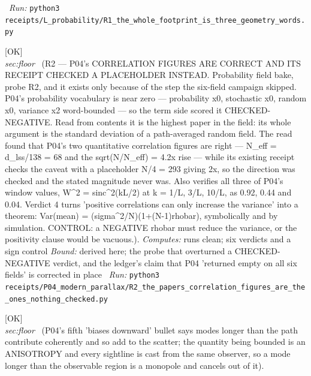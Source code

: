 \begin{description}
\ \emph{Run:} \texttt{python3 receipts/L\_probability/R1\_the\_whole\_footprint\_is\_three\_geometry\_words.py}
\item[\label{rcpt:R2_the_papers_correlation_figures_are_the_ones_nothing_checked}\texttt{R2\_the\_papers\_correlation\_figures\_are\_the\_ones\_nothing\_checked}]\hfill\textsf{[OK]}\\
\textit{sec:floor} \ (R2 --- P04's CORRELATION FIGURES ARE CORRECT AND ITS RECEIPT CHECKED A PLACEHOLDER INSTEAD. Probability field bake, probe R2, and it exists only because of the step the six-field campaign skipped. P04's probability vocabulary is near zero --- probability x0, stochastic x0, random x0, variance x2 word-bounded --- so the term side scored it CHECKED-NEGATIVE. Read from contents it is the highest paper in the field: its whole argument is the standard deviation of a path-averaged random field. The read found that P04's two quantitative correlation figures are right --- N\_eff = d\_lss/138 = 68 and the sqrt(N/N\_eff) = 4.2x rise --- while its existing receipt checks the caveat with a placeholder N/4 = 293 giving 2x, so the direction was checked and the stated magnitude never was. Also verifies all three of P04's window values, \textbar{}W\textbar{}\textasciicircum{}2 = sinc\textasciicircum{}2(kL/2) at k = 1/L, 3/L, 10/L, as 0.92, 0.44 and 0.04. Verdict 4 turns 'positive correlations can only increase the variance' into a theorem: Var(mean) = (sigma\textasciicircum{}2/N)(1+(N-1)rhobar), symbolically and by simulation. CONTROL: a NEGATIVE rhobar must reduce the variance, or the positivity clause would be vacuous.). 
\emph{Computes:} runs clean; six verdicts and a sign control
 \emph{Bound:} derived here; the probe that overturned a CHECKED-NEGATIVE verdict, and the ledger's claim that P04 'returned empty on all six fields' is corrected in place
\ \emph{Run:} \texttt{python3 receipts/P04\_modern\_parallax/R2\_the\_papers\_correlation\_figures\_are\_the\_ones\_nothing\_checked.py}
\item[\label{rcpt:R50_the_long_wavelength_bullet_reverses_for_the_observable_and_the_corner_is_three_parts_per_million}\texttt{R50\_the\_long\_wavelength\_bullet\_reverses\_for\_the\_observable\_and\_the\_corner\_is\_three\_parts\_per\_million}]\hfill\textsf{[OK]}\\
\textit{sec:floor} \ (P04's fifth 'biases downward' bullet says modes longer than the path contribute coherently and so add to the scatter; the quantity being bounded is an ANISOTROPY and every sightline is cast from the same observer, so a mode longer than the observable region is a monopole and cancels out of it). 

\end{description}

